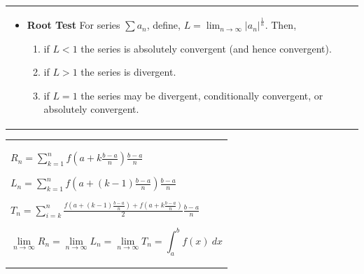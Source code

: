 \documentclass{article}
\newenvironment{bx}[1][]{
\begin{tcolorbox}[colback=white!97!black, title=#1, arc=0in, halign=flush left, left=1mm, right=1mm,]
}{
\end{tcolorbox}
}
\begin{document}
\begin{tabular}{p{263pt} p{280pt}}
\begin{bx}[Test for Convergence and Divergence]
\begin{itemize}[leftmargin=1em]
\item \textbf{Root Test}
For series $\sum a_{n}$, define,
$L={\displaystyle\lim _{n \to \infty}}\left|a_{n}\right|^{\frac{1}{n}}.$ Then,
\begin{enumerate}[leftmargin=1em]
    \item if $L<1$ the series is absolutely convergent (and hence convergent).
    \item if $L>1$ the series is divergent.
    \item if $L=1$ the series may be divergent, conditionally convergent, or absolutely convergent.
\end{enumerate}


\end{itemize}
\end{bx}

\vspace{3em}

\end{tabular}

\begin{tabular}{p{263px}}
\begin{bx}[Riemann Sums]
$ R_n=\sum_{k=1}^{n}f\left(a+k\frac{b-a}{n}\right)\frac{b-a}{n}$ 

$ L_n=\sum_{k=1}^{n}f\left(a+(k-1)\frac{b-a}{n}\right)\frac{b-a}{n}$ 

$ T_n=\sum_{i=k}^{n}\frac{f\left(a+(k-1)\frac{b-a}{n}\right)+f\left(a+k\frac{b-a}{n}\right)}{2}\frac{b-a}{n}$

$$\lim_{n\to\infty}R_n=\lim_{n\to\infty}L_n=\lim_{n\to\infty}T_n=\int_a^bf(x)\ dx$$
\end{bx}
\end{tabular}
\end{document}
